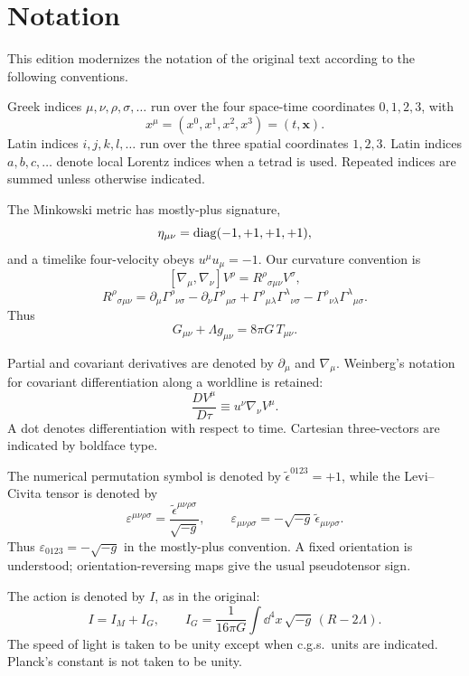 
\section*{Notation}

This edition modernizes the notation of the original text according to the
following conventions.

Greek indices $\mu,\nu,\rho,\sigma,\ldots$ run over the four space-time
coordinates $0,1,2,3$, with
\[
  x^\mu=(x^0,x^1,x^2,x^3)=(t,\mathbf{x}).
\]
Latin indices $i,j,k,l,\ldots$ run over the three spatial coordinates
$1,2,3$. Latin indices $a,b,c,\ldots$ denote local Lorentz indices when a
tetrad is used. Repeated indices are summed unless otherwise indicated.

The Minkowski metric has mostly-plus signature,
\[
  \eta_{\mu\nu}=\operatorname{diag}(-1,+1,+1,+1),
\]
and a timelike four-velocity obeys $u^\mu u_\mu=-1$. Our curvature convention
is
\[
  [\nabla_\mu,\nabla_\nu]V^\rho
  =R^\rho{}_{\sigma\mu\nu}V^\sigma,
\]
\[
  R^\rho{}_{\sigma\mu\nu}
  =\partial_\mu\Gamma^\rho{}_{\nu\sigma}
  -\partial_\nu\Gamma^\rho{}_{\mu\sigma}
  +\Gamma^\rho{}_{\mu\lambda}\Gamma^\lambda{}_{\nu\sigma}
  -\Gamma^\rho{}_{\nu\lambda}\Gamma^\lambda{}_{\mu\sigma}.
\]
Thus
\[
  G_{\mu\nu}+\Lambda g_{\mu\nu}=8\pi G\,T_{\mu\nu}.
\]

Partial and covariant derivatives are denoted by $\partial_\mu$ and
$\nabla_\mu$. Weinberg's notation for covariant differentiation along a
worldline is retained:
\[
  \frac{D V^\mu}{D\tau}\equiv u^\nu\nabla_\nu V^\mu.
\]
A dot denotes differentiation with respect to time. Cartesian three-vectors
are indicated by boldface type.

The numerical permutation symbol is denoted by
$\tilde\epsilon^{0123}=+1$, while the Levi--Civita tensor is denoted by
\[
  \varepsilon^{\mu\nu\rho\sigma}
  =\frac{\tilde\epsilon^{\mu\nu\rho\sigma}}{\sqrt{-g}},
  \qquad
  \varepsilon_{\mu\nu\rho\sigma}
  =-\sqrt{-g}\,\tilde\epsilon_{\mu\nu\rho\sigma}.
\]
Thus $\varepsilon_{0123}=-\sqrt{-g}$ in the mostly-plus convention. A fixed
orientation is understood; orientation-reversing maps give the usual
pseudotensor sign.

The action is denoted by $I$, as in the original:
\[
  I=I_M+I_G,\qquad
  I_G=\frac{1}{16\pi G}\int \dd^4x\,\sqrt{-g}\,(R-2\Lambda).
\]
The speed of light is taken to be unity except when c.g.s.\ units are
indicated. Planck's constant is not taken to be unity.
